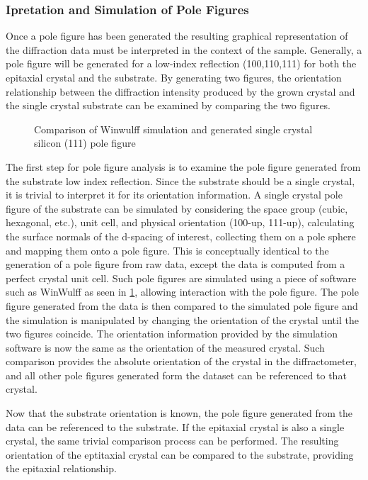 \subsubsection{Ipretation and Simulation of Pole Figures}
Once a pole figure has been generated the resulting graphical representation of the diffraction data must be interpreted in the context of the sample. Generally, a pole figure will be generated for a low-index reflection (100,110,111) for both the epitaxial crystal and the substrate. By generating two figures, the orientation relationship between the diffraction intensity produced by the grown crystal and the single crystal substrate can be examined by comparing the two figures.
\begin{figure}
    \centering
    \caption{\label{fig:exp_xray_winwulff}Comparison of Winwulff simulation and generated single crystal silicon (111) pole figure}
\end{figure}

The first step for pole figure analysis is to examine the pole figure generated from the substrate low index reflection. Since the substrate should be a single crystal, it is trivial to interpret it for its orientation information. A single crystal pole figure of the substrate can be simulated by considering the space group (cubic, hexagonal, etc.), unit cell, and physical orientation (100-up, 111-up), calculating the surface normals of the d-spacing of interest, collecting them on a pole sphere and mapping them onto a pole figure. This is conceptually identical to the generation of a pole figure from raw data, except the data is computed from a perfect crystal unit cell. Such pole figures are simulated using a piece of software such as WinWulff\cite{winwulff} as seen in \cref{fig:exp_xray_winwulff}, allowing interaction with the pole figure.  The pole figure generated from the data is then compared to the simulated pole figure and the simulation is manipulated by changing the orientation of the crystal until the two figures coincide. The orientation information provided by the simulation software is now the same as the orientation of the measured crystal. Such comparison provides the absolute orientation of the crystal in the diffractometer, and all other pole figures generated form the dataset can be referenced to that crystal.

Now that the substrate orientation is known, the pole figure generated from the data can be referenced to the substrate. If the epitaxial crystal is also a single crystal, the same trivial comparison process can be performed. The resulting orientation of the eptitaxial crystal can be compared to the substrate, providing the epitaxial relationship.

